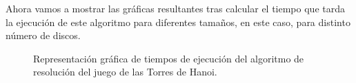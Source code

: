 \documentclass{homework}
\begin{document}
    Ahora vamos a mostrar las gráficas resultantes tras calcular el tiempo que tarda la ejecución de este algoritmo para diferentes
    tamaños, en este caso, para distinto número de discos.

    \begin{figure}
        \centering


        \caption{Representación gráfica de tiempos de ejecución del algoritmo de resolución del juego de las Torres de Hanoi.}

        \label{emp:hanoi}
    \end{figure}
\end{document}
